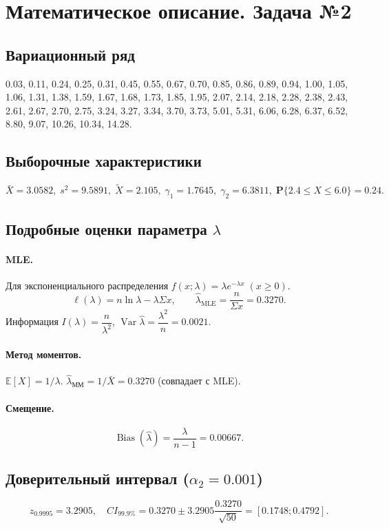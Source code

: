 \documentclass[areasetadvanced]{scrartcl}
\begin{document}
\section{Математическое описание. Задача №2}
\subsection{Вариационный ряд}
0.03, 0.11, 0.24, 0.25, 0.31, 0.45, 0.55, 0.67, 0.70, 0.85, 0.86, 0.89,
0.94, 1.00, 1.05, 1.06, 1.31, 1.38, 1.59, 1.67,
1.68, 1.73, 1.85, 1.95, 2.07, 2.14, 2.18, 2.28, 2.38, 2.43,
2.61, 2.67, 2.70, 2.75, 3.24, 3.27, 3.34, 3.70, 3.73,
5.01, 5.31, 6.06, 6.28, 6.37, 6.52, 8.80, 9.07,
10.26, 10.34, 14.28.

\subsection{Выборочные характеристики}
\[
\bar X=3.0582,\;
s^{2}=9.5891,\;
\tilde X=2.105,\;
\gamma_1=1.7645,\;
\gamma_2=6.3811,\;
\mathbf P\!\bigl\{2.4\le X\le6.0\bigr\}=0.24.
\]

\subsection{Подробные оценки параметра \(\lambda\)}
\paragraph{MLE.}
Для экспоненциального распределения
\(f(x;\lambda)=\lambda e^{-\lambda x}\;(x\ge0)\).
\[
\ell(\lambda)=n\ln\lambda-\lambda\Sigma x,
\qquad
\hat\lambda_{\text{MLE}}=\frac n{\Sigma x}=0.3270.
\]
Информация \(I(\lambda)=\dfrac{n}{\lambda^{2}}\),
\(\operatorname{Var}\hat\lambda=\dfrac{\lambda^{2}}{n}=0.0021\).

\paragraph{Метод моментов.}
\(\mathbb E[X]=1/\lambda\).  
\(\hat\lambda_{\text{ММ}}=1/\bar X=0.3270\)
(совпадает с MLE).

\paragraph{Смещение.}
\[
\operatorname{Bias}(\hat\lambda)=\frac{\lambda}{n-1}=0.00667.
\]

\subsection{Доверительный интервал (\(\alpha_2=0.001\))}
\[
z_{0.9995}=3.2905,\quad
CI_{99.9\%}=0.3270\pm3.2905\frac{0.3270}{\sqrt{50}}
           =[0.1748;0.4792].
\]
\end{document}
